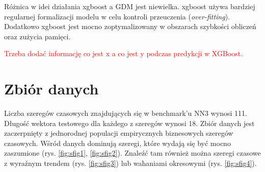 \documentclass[11pt]{report}
\begin{document}
Różnica w idei działania xgboost a GDM jest niewielka.
xgboost używa bardziej regularnej formalizacji modelu w celu kontroli przeuczenia (\textit{over-fitting}).
Dodatkowo xgboost jest mocno zoptymalizowany w obszarach szybkości obliczeń oraz zużycia pamięci.

\textcolor{red}{Trzeba dodać informację co jest x a co jest y podczas predykcji w XGBoost.}

\section{Zbiór danych}
Liczba szeregów czasowych znajdujących się w benchmark'u NN3 wynosi 111.
Długość wektora testowego dla każdego z szeregów wynosi 18.
Zbiór danych jest zaczerpnięty z jednorodnej populacji empirycznych biznesowych szeregów czasowych.
Wśród danych dominują szeregi, które wydają się być mocno zaszumione (rys. \ref{fig:sfig1}, \ref{fig:sfig2}).
Znaleźć tam również można szeregi czasowe z wyraźnym trendem (rys. \ref{fig:sfig3}) lub wahaniami okresowymi (rys. \ref{fig:sfig4}).
\end{document}
